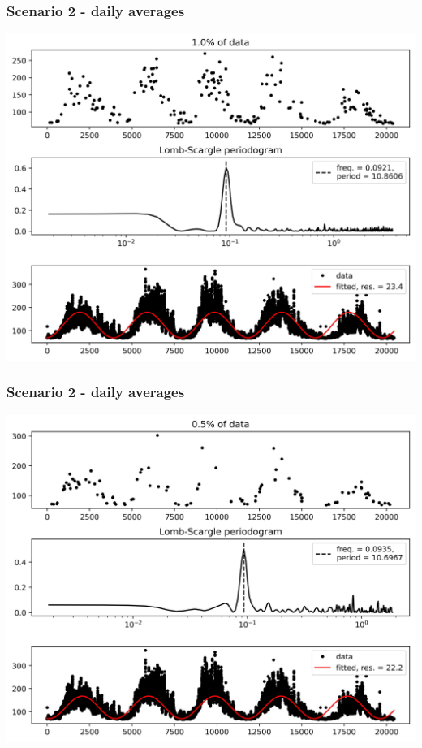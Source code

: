 \documentclass{beamer}
\begin{document}
\begin{frame}
\frametitle{Scenario 2 - daily averages}
\begin{center}
\includegraphics[scale=0.55]{../scripts/dataset1/periodograms_ny2.0_model1_pg0.99.jpg}
\end{center}
\end{frame}
\begin{frame}
\frametitle{Scenario 2 - daily averages}
\begin{center}
\includegraphics[scale=0.55]{../scripts/dataset1/periodograms_ny2.0_model1_pg0.995.jpg}
\end{center}
\end{frame}
\end{document}

